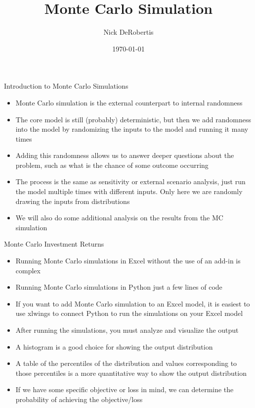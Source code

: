 \documentclass[]{article}
\begin{document}
\title{Monte Carlo Simulation}
\author{Nick DeRobertis}
\date{\today}
\maketitle
\begin{section}{Introduction to Monte Carlo Simulations}
\begin{itemize}
\item Monte Carlo simulation is the external counterpart to internal randomness
\item The core model is still (probably) deterministic, but then we add randomness into the model by randomizing the inputs to the model and running it many times
\item Adding this randomness allows us to answer deeper questions about the problem, such as what is the chance of some outcome occurring
\item The process is the same as sensitivity or external scenario analysis, just run the model multiple times with different inputs. Only here we are randomly drawing the inputs from distributions
\item We will also do some additional analysis on the results from the MC simulation
\end{itemize}
\end{section}
\begin{section}{Monte Carlo Investment Returns}
\begin{itemize}
\item Running Monte Carlo simulations in Excel without the use of an add-in is complex
\item Running Monte Carlo simulations in Python just a few lines of code
\item If you want to add Monte Carlo simulation to an Excel model, it is easiest to use xlwings to connect Python to run the simulations on your Excel model
\item After running the simulations, you must analyze and visualize the output
\item A histogram is a good choice for showing the output distribution
\item A table of the percentiles of the distribution and values corresponding to those percentiles is a more quantitative way to show the output distribution
\item If we have some specific objective or loss in mind, we can determine the probability of achieving the objective/loss
\end{itemize}
\end{section}
\end{document}

